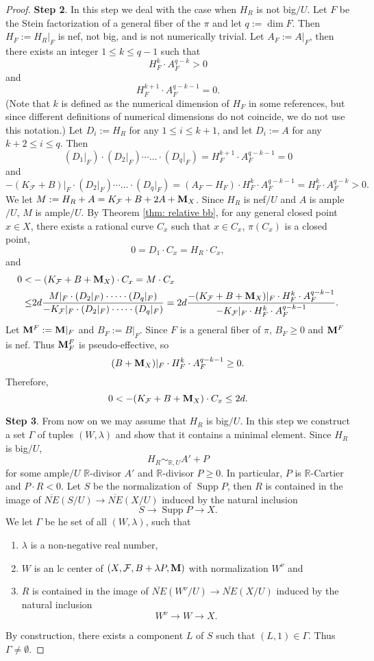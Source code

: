 \documentclass[11pt]{amsart}
\numberwithin{equation}{section}
\newcommand{\Mm}{{\bf{M}}}
\newcommand{\Rr}{\mathbb{R}}
\newcommand{\Supp}{\operatorname{Supp}}
\newcommand{\Ff}{\mathcal{F}}
\newcommand{\Ii}{\Gamma}
\theoremstyle{definition}
\theoremstyle{definition}
\theoremstyle{definition}
\begin{document}
\begin{proof}
\medskip

\noindent\textbf{Step 2}. In this step we deal with the case when $H_R$ is not big$/U$. Let $F$ be the Stein factorization of a general fiber of the $\pi$ and let $q:=\dim F$. Then $H_F:=H_R|_F$ is nef, not big, and is not numerically trivial. Let $A_F:=A|_F$, then there exists an integer $1\leq k\leq q-1$ such that
$$H_F^k\cdot A_F^{q-k}>0$$
and
$$H_F^{k+1}\cdot A_F^{q-k-1}=0.$$
(Note that $k$ is defined as the numerical dimension of $H_F$ in some references, but since different definitions of numerical dimensions do not coincide, we do not use this notation.)
Let $D_i:=H_R$ for any $1\leq i\leq k+1$, and let $D_i:=A$ for any $k+2\leq i\leq q$. Then
$$(D_1|_F)\cdot (D_2|_F)\cdots\dots\cdot (D_q|_F)=H_F^{k+1}\cdot A_F^{q-k-1}=0$$
and
$$-(K_{\Ff}+B)|_F\cdot (D_2|_F)\cdots\dots\cdot (D_q|_F)=(A_F-H_F)\cdot H_F^{k}\cdot A_F^{q-k-1}=H_F^{k}\cdot A_F^{q-k}>0.$$
We let $M:=H_R+A=K_{\Ff}+B+2A+\Mm_X$. Since $H_R$ is nef$/U$ and $A$ is ample$/U$, $M$ is ample$/U$. By Theorem \ref{thm: relative bb}, for any general closed point $x\in X$, there exists a rational curve $C_x$ such that $x\in C_x$, $\pi(C_x)$ is a closed point, $$0=D_1\cdot C_x=H_R\cdot C_x,$$
and
\begin{align*}
    0<&-(K_{\Ff}+B+\Mm_X)\cdot C_x=M\cdot C_x\\
    \leq& 2d\frac{M|_F\cdot  (D_2|_F)\cdot\dots\cdot (D_q|_F)}{-K_{\Ff}|_F\cdot  (D_2|_F)\cdot\dots\cdot (D_q|_F)}=2d\frac{-(K_{\Ff}+B+\Mm_X)|_F\cdot H_F^k\cdot A_F^{q-k-1}}{-K_{\Ff}|_F\cdot H_F^k\cdot A_F^{q-k-1}}.
\end{align*}
Let $\Mm^F:=\Mm|_F$ and $B_F:=B|_F$. Since $F$ is a general fiber of $\pi$, $B_F\geq 0$ and $\Mm^F$ is nef. Thus $\Mm^F_F$ is pseudo-effective, so 
$$(B+\Mm_X)|_F\cdot H_F^k\cdot A_F^{q-k-1}\geq 0.$$
Therefore, 
$$0<-(K_{\Ff}+B+\Mm_X)\cdot C_x\leq 2d.$$

\medskip

\noindent\textbf{Step 3}. From now on we may assume that $H_R$ is big$/U$. In this step we construct a set $\Ii$ of tuples $(W,\lambda)$ and show that it contains a minimal element. Since $H_R$ is big$/U$,
$$H_R\sim_{\mathbb R,U}A'+P$$
for some ample$/U$ $\Rr$-divisor $A'$ and $\Rr$-divisor $P\geq 0$. In particular, $P$ is $\Rr$-Cartier and $P\cdot R<0$. Let $S$ be the normalization of $\Supp P$, then $R$ is contained in the image of $\overline{NE}(S/U)\rightarrow\overline{NE}(X/U)$ induced by the natural inclusion 
$$S\rightarrow \Supp P\rightarrow X.$$ 
We let $\Ii$ be he set of all $(W,\lambda)$, such that
\begin{enumerate}
    \item $\lambda$ is a non-negative real number,
    \item $W$ is an lc center of $(X,\Ff,B+\lambda P,\Mm)$ with normalization $W^\nu$ and
    \item $R$ is contained in the image of $\overline{NE}(W^\nu/U)\rightarrow\overline{NE}(X/U)$  induced by the natural inclusion 
$$W^\nu\rightarrow W\rightarrow X.$$
\end{enumerate}
By construction, there exists a component $L$ of $S$ such that $(L,1)\in\Ii$. Thus $\Ii\not=\emptyset$. 


\end{proof}
\end{document}
